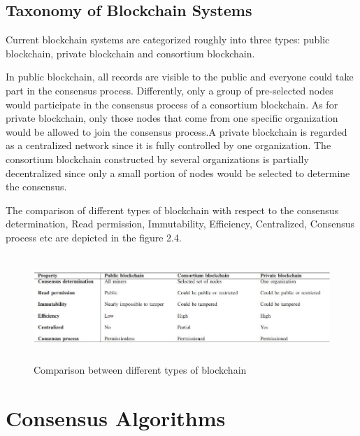 \documentclass[12pt]{report}
\begin{document}
\section{Taxonomy of Blockchain Systems}
\par Current blockchain systems are categorized roughly into
three types: public blockchain, private blockchain and consortium
blockchain.
\par In public blockchain, all records are visible to the public and everyone could take part in the consensus process. Differently, only a group of pre-selected nodes would participate in the consensus process of a consortium
blockchain. As for private blockchain, only those nodes that
come from one specific organization would be allowed to join
the consensus process.A private blockchain is regarded as a centralized network
since it is fully controlled by one organization. The consortium
blockchain constructed by several organizations is partially
decentralized since only a small portion of nodes would be
selected to determine the consensus.
\par The comparison of different types of blockchain with respect to the consensus determination, Read permission, Immutability, Efficiency, Centralized, Consensus process etc are depicted in the figure 2.4.
\begin{figure}
    \centering
    \includegraphics[width=14cm,height=4cm]{Table-1.JPG}
    \caption{Comparison between different types of blockchain}
    \label{fig:my_label}
\end{figure}

\chapter{Consensus Algorithms}
\end{document}
